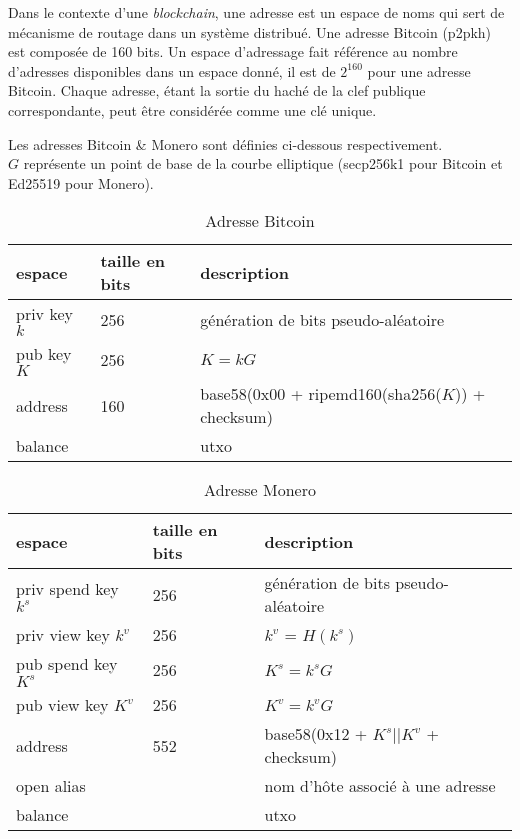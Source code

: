 Dans le contexte d'une \textit{\gls{blockchain}}, une adresse est un espace de noms qui sert 
de mécanisme de routage dans un système distribué. Une adresse 
Bitcoin\cite{bitcoin_address} (\acrshort{p2pkh}) est composée de 160 bits.
Un espace d'adressage fait référence au nombre d'adresses disponibles dans un espace 
donné, il est de $2^{160}$ pour une adresse Bitcoin. 
Chaque adresse, étant la sortie du haché de la clef publique correspondante, peut être 
considérée comme une clé unique.

\bigskip 
\noindent
Les adresses Bitcoin \& Monero\cite{monero_address, monero_address2} sont définies 
ci-dessous respectivement.\\
$G$ représente un point de base de la courbe elliptique (secp256k1\cite{bitcoin_secp} 
pour Bitcoin et Ed25519\cite[5]{monero_wp} pour Monero).

\begin{table}[!ht]
    \centering
    \begin{tabular}{|l|l|l|}
    \hline
        espace & taille en bits & description \\ \hline
        priv key $k$ & 256 & génération de bits pseudo-aléatoire \\ \hline
        pub key $K$ & 256 & $K=kG$ \\ \hline
        address & 160 & base58(0x00 + ripemd160(sha256($K$)) + checksum) \\ \hline
        balance & ~ & \acrshort{utxo} \\ \hline
    \end{tabular}
    \caption{Adresse Bitcoin}
\end{table}

\begin{table}[!ht]
    \centering
    \begin{tabular}{|l|l|l|}
    \hline
        espace & taille en bits & description \\ \hline
        priv spend key $k^s$ & 256 & génération de bits pseudo-aléatoire \\ \hline
        priv view key $k^v$ & 256 & $k^v$ = $H(k^s)$ \\ \hline
        pub spend key $K^s$ & 256 & $K^s = k^sG$ \\ \hline
        pub view key $K^v$ & 256 & $K^v = k^vG$ \\ \hline
        address & 552 & base58(0x12 + $K^s||K^v$ + checksum) \\ \hline
        open alias & ~ & nom d'hôte associé à une adresse \\ \hline
        balance & ~ & \acrshort{utxo} \\ \hline
    \end{tabular}
    \caption{Adresse Monero}
\end{table}

